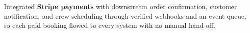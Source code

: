 \documentclass[letterpaper,11pt]{article}
\newcommand{\swallow}[1]{}
\begin{document}
{      %
      \item Integrated \textbf{Stripe payments} with downstream order confirmation, customer notification, and crew scheduling through verified webhooks and an event queue, so each paid booking flowed to every system with no manual hand-off.
    }
\end{document}
